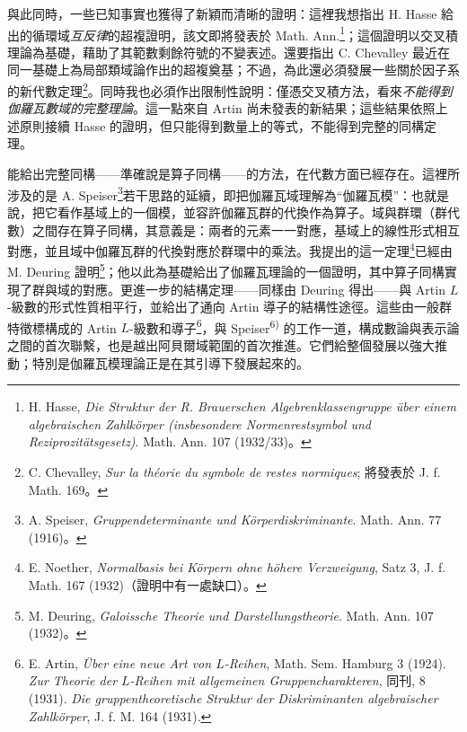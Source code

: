 \documentclass[11pt]{article}
\begin{document}
與此同時，一些已知事實也獲得了新穎而清晰的證明：這裡我想指出 H. Hasse 給出的循環域\emph{互反律}的超複證明，該文即將發表於 Math. Ann.\footnote{H. Hasse, \emph{Die Struktur der R. Brauerschen Algebrenklassengruppe über einem algebraischen Zahlkörper (insbesondere Normenrestsymbol und Reziprozitätsgesetz)}. Math. Ann. 107 (1932/33)。}；這個證明以交叉積理論為基礎，藉助了其範數剩餘符號的不變表述。還要指出 C. Chevalley 最近在同一基礎上為局部類域論作出的超複奠基；不過，為此還必須發展一些關於因子系的新代數定理\footnote{C. Chevalley, \emph{Sur la théorie du symbole de restes normiques}; 將發表於 J. f. Math. 169。}。同時我也必須作出限制性說明：僅憑交叉積方法，看來\emph{不能得到伽羅瓦數域的完整理論}。這一點來自 Artin 尚未發表的新結果；這些結果依照上述原則接續 Hasse 的證明，但只能得到數量上的等式，不能得到完整的同構定理。

能給出完整同構——準確說是算子同構——的方法，在代數方面已經存在。這裡所涉及的是 A. Speiser\footnote{A. Speiser, \emph{Gruppendeterminante und Körperdiskriminante}. Math. Ann. 77 (1916)。}若干思路的延續，即把伽羅瓦域理解為“伽羅瓦模”：也就是說，把它看作基域上的一個模，並容許伽羅瓦群的代換作為算子。域與群環（群代數）之間存在算子同構，其意義是：兩者的元素一一對應，基域上的線性形式相互對應，並且域中伽羅瓦群的代換對應於群環中的乘法。我提出的這一定理\footnote{E. Noether, \emph{Normalbasis bei Körpern ohne höhere Verzweigung}, Satz 3, J. f. Math. 167 (1932)（證明中有一處缺口）。}已經由 M. Deuring 證明\footnote{M. Deuring, \emph{Galoissche Theorie und Darstellungstheorie}. Math. Ann. 107 (1932)。}；他以此為基礎給出了伽羅瓦理論的一個證明，其中算子同構實現了群與域的對應。更進一步的結構定理——同樣由 Deuring 得出——與 Artin \(L\)-級數的形式性質相平行，並給出了通向 Artin 導子的結構性途徑。這些由一般群特徵標構成的 Artin \(L\)-級數和導子\footnote{E. Artin, \emph{Über eine neue Art von \(L\)-Reihen}, Math. Sem. Hamburg 3 (1924). \emph{Zur Theorie der \(L\)-Reihen mit allgemeinen Gruppencharakteren}, 同刊, 8 (1931). \emph{Die gruppentheoretische Struktur der Diskriminanten algebraischer Zahlkörper}, J. f. M. 164 (1931).}，與 Speiser\textsuperscript{6)} 的工作一道，構成數論與表示論之間的首次聯繫，也是越出阿貝爾域範圍的首次推進。它們給整個發展以強大推動；特別是伽羅瓦模理論正是在其引導下發展起來的。
\end{document}
